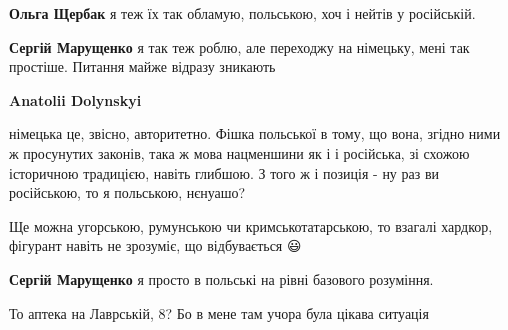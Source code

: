 \begin{itemize}
\begin{itemize}
 
\textbf{Ольга Щербак} я теж їх так обламую, польською, хоч і нейтів у російській.

 
\textbf{Сергій Марущенко} я так теж роблю, але переходжу на німецьку, мені так простіше. Питання майже відразу зникають

 
\textbf{Anatolii Dolynskyi} 

німецька це, звісно, авторитетно. Фішка польської в тому, що вона, згідно ними
ж просунутих законів, така ж мова нацменшини як і і російська, зі схожою
історичною традицією, навіть глибшою. З того ж і позиція - ну раз ви
російською, то я польською, нєнуашо?

Ще можна угорською, румунською чи кримськотатарською, то взагалі хардкор,
фігурант навіть не зрозуміє, що відбувається 😃


 
\textbf{Сергій Марущенко} я просто в польські на рівні базового розуміння.
\end{itemize}

 
То аптека на Лаврській, 8? Бо в мене там учора була цікава ситуація \Smiley[1.0][yellow]


\end{itemize}
